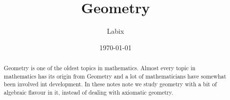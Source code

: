 \documentclass[a4paper]{article}
\title{Geometry}
\author{Labix}
\date{\today}
\begin{document}
\maketitle
\begin{abstract}
Geometry is one of the oldest topics in mathematics. Almost every topic in mathematics has its origin from Geometry and a lot of mathematicians have somewhat been involved int development. In these notes note we study geometry with a bit of algebraic flavour in it, instead of dealing with axiomatic geometry. 
\end{abstract}
\tableofcontents
\pagebreak

\end{document}
